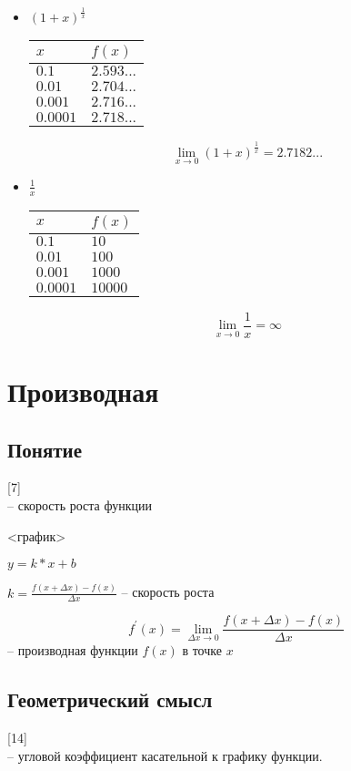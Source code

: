 \documentclass{article}
\begin{document}
\begin{itemize}
	\item $(1 + x)^\frac{1}{x}$

		\begin{tabular}{ | l | l | }
			\hline
			$x$ & $f(x)$ \\ \hline
			$0.1$ & $2.593...$ \\
			$0.01$ & $2.704...$ \\
			$0.001$ & $2.716...$ \\
			$0.0001$ & $2.718...$ \\
			\hline
		\end{tabular}

		$$\lim_{x \to 0} (1 + x)^\frac{1}{x} = 2.7182...$$

	\item  $\frac{1}{x}$

		\begin{tabular}{ | l | l | }
			\hline
			$x$ & $f(x)$ \\ \hline
			$0.1$ & $10$ \\
			$0.01$ & $100$ \\
			$0.001$ & $1000$ \\
			$0.0001$ & $10000$ \\
			\hline
		\end{tabular}

		$$\lim_{x \to 0} \frac{1}{x} = \infty$$

\end{itemize}


\section{Производная}
\label{section:derivative}
\subsection{Понятие}
[7]\\
-- скорость роста функции

<график>

$y = k*x + b$

$k = \frac{f(x + \Delta x) - f(x)}{\Delta x}$ -- скорость роста

$$f^\prime(x) = \lim_{\Delta x \to 0} \frac{f(x + \Delta x) - f(x)}{\Delta x}$$ -- производная функции $f(x)$ в точке $x$

\subsection{Геометрический смысл}
[14]\\
-- угловой коэффициент касательной к графику функции.
\end{document}
